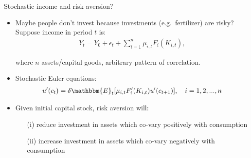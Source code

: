 \documentclass[aspectratio=169, 10pt, handout]{beamer}
\begin{document}
\begin{frame}{Stochastic income and risk aversion?} %

\begin{itemize}

	\item Maybe people don't invest because investments (e.g.\ fertilizer) are risky? Suppose income in period $t$ is:
	\begin{align}
	Y_{t} = Y_0 + \epsilon_t + \sum_{i=1}^n \mu_{i,t}  F_i(K_{i,t}),
	\end{align}
	
	where $n$ assets/capital goods, arbitrary pattern of correlation. 
	
	\bigskip
	
	\item Stochastic Euler equations:
  	\begin{align}
	u^{\prime}(c_t) = \delta \mathbbm{E}_t [ \mu_{i,t}  F_i^{\prime} (K_{i,t}) u^\prime (c_{t+1})], \quad i=1, 2 ,..., n
  	\end{align}

	\item Given initial capital stock, risk aversion will:
	
	\begin{itemize}
	
		\item[(i)] reduce investment in assets which co-vary positively with consumption

		\item[(ii)] increase investment in assets which co-vary negatively with consumption

	\end{itemize}
	
	



\end{itemize}

\end{frame}
\end{document}

